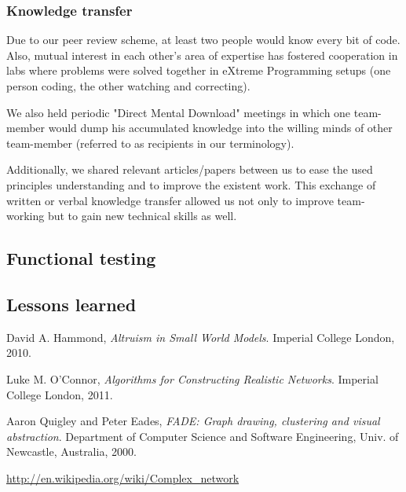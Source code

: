 \documentclass[a4paper,11pt,titlepage]{article}
\begin{document}
\subsubsection{Knowledge transfer}
Due to our peer review scheme, at least two people would know every
bit of code. Also, mutual interest in each other's area of expertise
has fostered cooperation in labs where problems were solved together
in eXtreme Programming setups (one person coding, the other watching
and correcting).

We also held periodic "Direct Mental Download" meetings in which one
team-member would dump his accumulated knowledge into the willing
minds of other team-member (referred to as recipients in our terminology).

Additionally, we shared relevant articles/papers between us to ease
the used principles understanding and to improve the existent work.
This exchange of written or verbal knowledge transfer allowed us not
only to improve team-working but to gain new technical skills as well.


\subsection{Functional testing}
\label{tests}

\subsection{Lessons learned}

\begin{thebibliography}{9}

  David A. Hammond,
  \emph{Altruism in Small World Models}.
  Imperial College London,
  2010.

  Luke M. O'Connor,
  \emph{Algorithms for Constructing Realistic Networks}.
  Imperial College London,
  2011.

  Aaron Quigley and Peter Eades,
  \emph{FADE: Graph drawing, clustering and visual abstraction}.
  Department of Computer Science and Software Engineering,
  Univ. of  Newcastle, Australia, 2000.

  \url{http://en.wikipedia.org/wiki/Complex_network}

\end{thebibliography}
\end{document}
